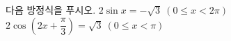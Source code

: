 다음 방정식을 푸시오.
 $2\sin x=-\sqrt{3}\ (0\le x<2\pi)$
 $2\cos\left(2x+\dfrac{\pi}{3}\right)=\sqrt{3}\ (0\le x<\pi)$
